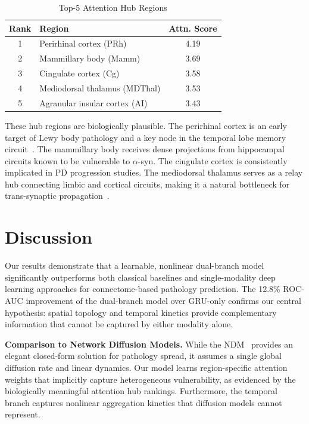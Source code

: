 \documentclass[conference]{IEEEtran}
\begin{document}
\begin{table}[t]
\centering
\caption{Top-5 Attention Hub Regions}
\label{tab:attention}
\renewcommand{\arraystretch}{1.15}
\begin{tabular}{@{}clc@{}}
\toprule
\textbf{Rank} & \textbf{Region} & \textbf{Attn. Score} \\
\midrule
1 & Perirhinal cortex (PRh) & 4.19 \\
2 & Mammillary body (Mamm) & 3.69 \\
3 & Cingulate cortex (Cg) & 3.58 \\
4 & Mediodorsal thalamus (MDThal) & 3.53 \\
5 & Agranular insular cortex (AI) & 3.43 \\
\bottomrule
\end{tabular}
\end{table}

These hub regions are biologically plausible. The perirhinal cortex is an early target of Lewy body pathology and a key node in the temporal lobe memory circuit~\cite{braak2003staging}. The mammillary body receives dense projections from hippocampal circuits known to be vulnerable to $\alpha$-syn. The cingulate cortex is consistently implicated in PD progression studies. The mediodorsal thalamus serves as a relay hub connecting limbic and cortical circuits, making it a natural bottleneck for trans-synaptic propagation~\cite{raj2018models}.

\section{Discussion}

Our results demonstrate that a learnable, nonlinear dual-branch model significantly outperforms both classical baselines and single-modality deep learning approaches for connectome-based pathology prediction. The 12.8\% ROC-AUC improvement of the dual-branch model over GRU-only confirms our central hypothesis: spatial topology and temporal kinetics provide complementary information that cannot be captured by either modality alone.

\textbf{Comparison to Network Diffusion Models.} While the NDM~\cite{raj2012network} provides an elegant closed-form solution for pathology spread, it assumes a single global diffusion rate and linear dynamics. Our model learns region-specific attention weights that implicitly capture heterogeneous vulnerability, as evidenced by the biologically meaningful attention hub rankings. Furthermore, the temporal branch captures nonlinear aggregation kinetics that diffusion models cannot represent.
\end{document}
